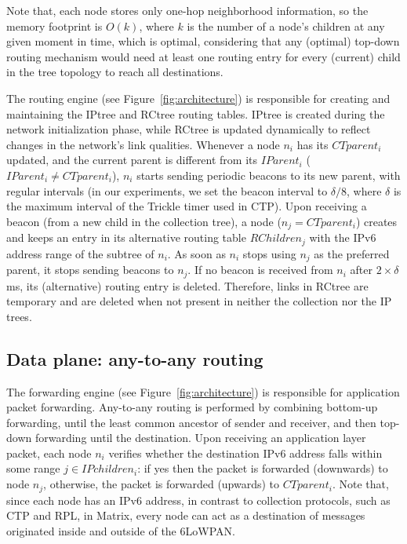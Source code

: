 Note that, each node stores only one-hop
neighborhood information, so the memory footprint is $O(k)$, where $k$ is the
number of a node's children at any given moment in time, which is optimal,
considering that any (optimal) top-down routing mechanism would need at
least one routing entry for every (current) child in the tree topology to reach
all destinations.

The routing engine (see Figure~\ref{fig:architecture}) is responsible for
creating and maintaining the IPtree and RCtree routing tables. IPtree is created
during the network initialization phase, while RCtree is updated dynamically to
reflect changes in the network's link qualities. Whenever a node $n_i$ has its
$CTparent_i$ updated, and the current parent is different from its
$IParent_i$ ($IParent_i \neq CTparent_i$), $n_i$ starts sending periodic beacons
to its new parent, with regular intervals (in our experiments, we set the beacon
interval to $\delta/8$, where $\delta$ is the maximum interval of the
Trickle timer used in CTP).
Upon receiving a beacon (from a new child in the collection tree), a node
($n_j = CTparent_i$) creates and keeps an entry in its alternative
routing table $RChildren_j$ with the IPv6 address range of the subtree of $n_i$. As soon as $n_i$
stops using $n_j$ as the preferred parent, it stops sending beacons to $n_j$.
If no beacon is received from $n_i$ after $2\times\delta$ ms, its (alternative)
routing entry is deleted. Therefore, links in RCtree are temporary and are deleted when not present in neither the collection nor the IP trees.

\subsection{Data plane: any-to-any routing}

The forwarding engine (see Figure~\ref{fig:architecture}) is responsible for
application packet forwarding. Any-to-any routing is performed by combining
  bottom-up forwarding, until the least common ancestor of sender and
  receiver, and then top-down forwarding until the destination. Upon receiving
  an application layer packet, each node $n_i$ verifies whether the destination IPv6 address falls within some range
$j \in IPchildren_i$: if yes then the packet is forwarded
(downwards) to node $n_j$, otherwise, the packet is forwarded
(upwards) to $CTparent_i$. Note that, since each node has an IPv6
address, in contrast to collection protocols, such as CTP and RPL,
in Matrix, every node can act as a destination of messages
originated inside and outside of the 6LoWPAN.


